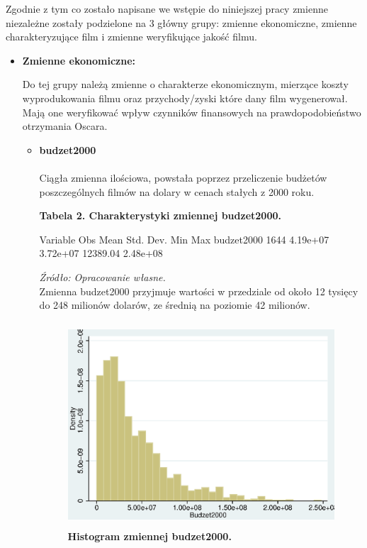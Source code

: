 Zgodnie z tym co zostało napisane we wstępie do niniejszej pracy zmienne niezależne zostały podzielone na 3 główny grupy: zmienne ekonomiczne, zmienne charakteryzujące film i zmienne weryfikujące jakość filmu.
\vspace{0.3cm}
\begin{itemize}
\item \textbf{\large{Zmienne ekonomiczne:}}
\vspace{0.3cm}

Do tej grupy należą zmienne o charakterze ekonomicznym, mierzące koszty wyprodukowania filmu oraz przychody/zyski które dany film wygenerował. Mają one weryfikować wpływ czynników finansowych na prawdopodobieństwo otrzymania Oscara.

  	\begin{itemize}
  	\item[\ding{228}]\textbf{budzet2000} \\
  	\\Ciągła zmienna ilościowa, powstała poprzez przeliczenie budżetów poszczególnych filmów na dolary w cenach stałych z 2000 roku. \\
  	
\vspace{3cm}
	
{\centering
\textbf{Tabela 2. Charakterystyki zmiennej budzet2000.}}
\begin{stlog}	
	
    Variable {\VBAR}       Obs        Mean    Std. Dev.       Min        Max
  budzet2000 {\VBAR}      1644    4.19e+07    3.72e+07   12389.04   2.48e+08
{\smallskip}
	
\end{stlog}

\textit{\footnotesize{Źródło: Opracowanie własne.}} \\
  	
Zmienna budzet2000 przyjmuje wartości w przedziale od około 12 tysięcy do 248 milionów dolarów, ze średnią na poziomie 42 milionów.\\

\begin{figure}[h]
\begin{centering}
  \includegraphics[height=3in]{Rysunki//budzet2000}
    \caption{\textbf{Histogram zmiennej budzet2000.}}
\end{centering}
\end{figure}


\end{itemize}
\end{itemize}
